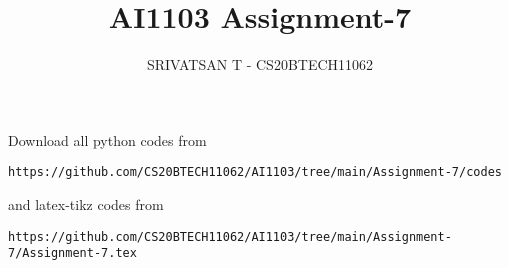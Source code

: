 \documentclass[journal,12pt,twocolumn]{IEEEtran}
\DeclareMathOperator*{\Res}{Res}
\begin{document}
\newcommand{\BEQA}{\begin{eqnarray}}
        \newcommand{\EEQA}{\end{eqnarray}}
\newcommand{\define}{\stackrel{\triangle}{=}}

\raggedbottom
\setlength{\parindent}{0pt}
\providecommand{\mbf}{\mathbf}
\providecommand{\pr}[1]{\ensuremath{\Pr\left(#1\right)}}
\providecommand{\qfunc}[1]{\ensuremath{Q\left(#1\right)}}
\providecommand{\sbrak}[1]{\ensuremath{{}\left[#1\right]}}
\providecommand{\lsbrak}[1]{\ensuremath{{}\left[#1\right.}}
\providecommand{\rsbrak}[1]{\ensuremath{{}\left.#1\right]}}
\providecommand{\brak}[1]{\ensuremath{\left(#1\right)}}
\providecommand{\lbrak}[1]{\ensuremath{\left(#1\right.}}
\providecommand{\rbrak}[1]{\ensuremath{\left.#1\right)}}
\providecommand{\cbrak}[1]{\ensuremath{\left\{#1\right\}}}
\providecommand{\lcbrak}[1]{\ensuremath{\left\{#1\right.}}
\providecommand{\rcbrak}[1]{\ensuremath{\left.#1\right\}}}
\theoremstyle{remark}
\newtheorem{rem}{Remark}
\newcommand{\sgn}{\mathop{\mathrm{sgn}}}
\providecommand{\abs}[1]{\vert#1\vert}
\providecommand{\res}[1]{\Res\displaylimits_{#1}}
\providecommand{\norm}[1]{\lVert#1\rVert}
\providecommand{\mtx}[1]{\mathbf{#1}}
\providecommand{\mean}[1]{E[#1]}
\providecommand{\fourier}{\overset{\mathcal{F}}{ \rightleftharpoons}}
\providecommand{\system}{\overset{\mathcal{H}}{ \longleftrightarrow}}
\newcommand{\solution}{\noindent \textbf{Solution: }}
\newcommand{\cosec}{\,\text{cosec}\,}
\newcommand{\comb}[2]{{}^{#1}\mathrm{C}_{#2}}
\providecommand{\dec}[2]{\ensuremath{\overset{#1}{\underset{#2}{\gtrless}}}}
\newcommand{\myvec}[1]{\ensuremath{\begin{pmatrix}#1\end{pmatrix}}}
\newcommand{\mydet}[1]{\ensuremath{\begin{vmatrix}#1\end{vmatrix}}}
\makeatletter
{}
\makeatother
\let\StandardTheFigure\thefigure
\let\vec\mathbf
\renewcommand{\thefigure}{\theproblem}
\def\putbox#1#2#3{\makebox[0in][l]{\makebox[#1][l]{}\raisebox{\baselineskip}[0in][0in]{\raisebox{#2}[0in][0in]{#3}}}}
\def\rightbox#1{\makebox[0in][r]{#1}}
\def\centbox#1{\makebox[0in]{#1}}
\def\topbox#1{\raisebox{-\baselineskip}[0in][0in]{#1}}
\def\midbox#1{\raisebox{-0.5\baselineskip}[0in][0in]{#1}}
\vspace{3cm}
\title{AI1103 Assignment-7}
\author{SRIVATSAN T - CS20BTECH11062}
\maketitle
\newpage
\bigskip
\renewcommand{\thefigure}{\theenumi}
\renewcommand{\thetable}{\theenumi}
Download all python codes from
\begin{lstlisting}
https://github.com/CS20BTECH11062/AI1103/tree/main/Assignment-7/codes
\end{lstlisting}
%
and latex-tikz codes from
%
\begin{lstlisting}
https://github.com/CS20BTECH11062/AI1103/tree/main/Assignment-7/Assignment-7.tex
\end{lstlisting}
\end{document}
